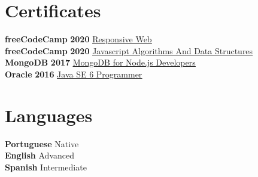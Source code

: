 \documentclass[10pt,a4paper]{article}
\begin{document}
\begin{minipage}[t]{0.7\textwidth}
\section*{Certificates}
{\color{head} \textbf{freeCodeCamp}} \textbf{2020} \href{https://www.freecodecamp.org/certification/joelxr/responsive-web-design}{\uline{Responsive Web \faExternalLink}} \\
{\color{head} \textbf{freeCodeCamp}} \textbf{2020} \href{https://www.freecodecamp.org/certification/joelxr/javascript-algorithms-and-data-structures}{\uline{Javascript Algorithms And Data Structures \faExternalLink}} \\
{\color{head} \textbf{MongoDB}} \textbf{2017} \href{https://university.mongodb.com/course_completion/eb01dff6-609c-4eb3-bcfe-e8078451?utm_source=copy&utm_medium=social&utm_campaign=university_social_sharing}{\uline{MongoDB for Node.js Developers \faExternalLink}} \\
{\color{head} \textbf{Oracle}} \textbf{2016} \href{https://www.dropbox.com/s/l8mek0rc72unfwc/Certificado_OCJP.pdf?dl=0}{\uline{Java SE 6 Programmer \faExternalLink}} \\
\end{minipage}
\hspace{0.2cm}
\begin{minipage}[t]{0.3\textwidth}
\section*{Languages}
{\color{head} \textbf{Portuguese}} Native \\
{\color{head} \textbf{English}} Advanced \\
{\color{head} \textbf{Spanish}} Intermediate
\end{minipage}
\end{document}
